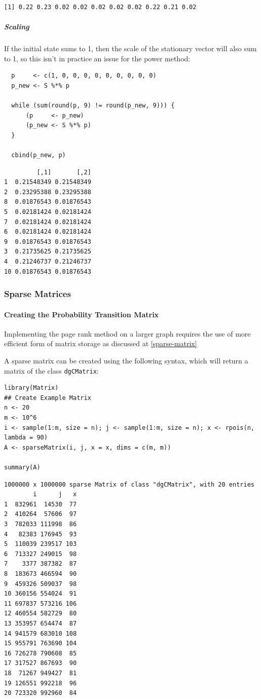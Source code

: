 \documentclass[11pt]{article}
\begin{document}
\begin{verbatim}
[1] 0.22 0.23 0.02 0.02 0.02 0.02 0.02 0.22 0.21 0.02
\end{verbatim}

\subparagraph{Scaling}
\label{scaling}
If the initial state sums to 1, then the scale of the stationary
vector will also sum to 1, so this isn't in practice an issue for the power method:

\begin{verbatim}
  p     <- c(1, 0, 0, 0, 0, 0, 0, 0, 0, 0)
  p_new <- S %*% p

  while (sum(round(p, 9) != round(p_new, 9))) {
      (p     <- p_new)
      (p_new <- S %*% p)
  }

  cbind(p_new, p)
\end{verbatim}

\begin{verbatim}
         [,1]       [,2]
1  0.21548349 0.21548349
2  0.23295388 0.23295388
8  0.01876543 0.01876543
5  0.02181424 0.02181424
7  0.02181424 0.02181424
6  0.02181424 0.02181424
9  0.01876543 0.01876543
3  0.21735625 0.21735625
4  0.21246737 0.21246737
10 0.01876543 0.01876543
\end{verbatim}

\subsubsection{Sparse Matrices}
\label{sec:org4926eba}
\paragraph{Creating the Probability Transition Matrix}
\label{sec:org7a06095}
Implementing the page rank method on a larger graph requires the use of more
efficient form of matrix storage as discussed at \ref{sparse-matrix}

A sparse matrix can be created using the following syntax, which will return a
matrix of the class \texttt{dgCMatrix}:

\begin{verbatim}
library(Matrix)
## Create Example Matrix
n <- 20
m <- 10^6
i <- sample(1:m, size = n); j <- sample(1:m, size = n); x <- rpois(n, lambda = 90)
A <- sparseMatrix(i, j, x = x, dims = c(m, m))

summary(A)
\end{verbatim}

\begin{verbatim}
1000000 x 1000000 sparse Matrix of class "dgCMatrix", with 20 entries
        i      j   x
1  832961  14530  77
2  410264  57606  97
3  782033 111998  86
4   82383 176945  93
5  110039 239517 103
6  713327 249015  98
7    3377 387382  87
8  183673 466594  90
9  459326 509037  98
10 360156 554024  91
11 697837 573216 106
12 460554 582729  80
13 353957 654474  87
14 941579 683010 108
15 955791 763690 104
16 726278 790608  85
17 317527 867693  90
18  71267 949427  81
19 126551 992218  96
20 723320 992960  84
\end{verbatim}
\end{document}
